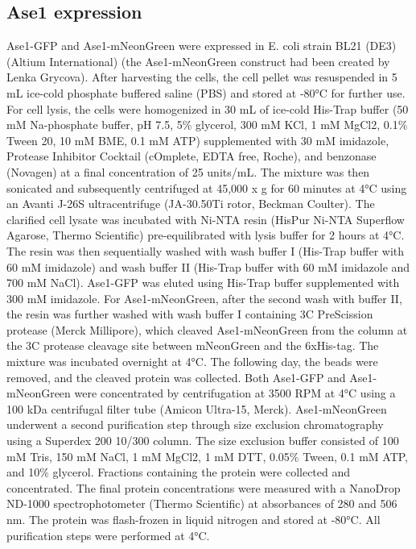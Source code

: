 \subsection{Ase1 expression}
Ase1-GFP \parencite{Janson2007} and Ase1-mNeonGreen were expressed in E. coli strain BL21 (DE3) (Altium International) \alert{(the Ase1-mNeonGreen construct had been created by Lenka Grycova)}. After harvesting the cells, the cell pellet was resuspended in 5 mL ice-cold phosphate buffered saline (PBS) and stored at -80°C for further use. For cell lysis, the cells were homogenized in 30 mL of ice-cold His-Trap buffer (50 mM Na-phosphate buffer, pH 7.5, 5\% glycerol, 300 mM KCl, 1 mM MgCl2, 0.1\% Tween 20, 10 mM BME, 0.1 mM ATP) supplemented with 30 mM imidazole, Protease Inhibitor Cocktail (cOmplete, EDTA free, Roche), and benzonase (Novagen) at a final concentration of 25 units/mL. The mixture was then sonicated and subsequently centrifuged at 45,000 x g for 60 minutes at 4°C using an Avanti J-26S ultracentrifuge (JA-30.50Ti rotor, Beckman Coulter). The clarified cell lysate was incubated with Ni-NTA resin (HisPur Ni-NTA Superflow Agarose, Thermo Scientific) pre-equilibrated with lysis buffer for 2 hours at 4°C. The resin was then sequentially washed with wash buffer I (His-Trap buffer with 60 mM imidazole) and wash buffer II (His-Trap buffer with 60 mM imidazole and 700 mM NaCl). Ase1-GFP was eluted using His-Trap buffer supplemented with 300 mM imidazole. For Ase1-mNeonGreen, after the second wash with buffer II, the resin was further washed with wash buffer I containing 3C PreScission protease (Merck Millipore), which cleaved Ase1-mNeonGreen from the column at the 3C protease cleavage site between mNeonGreen and the 6xHis-tag. The mixture was incubated overnight at 4°C. The following day, the beads were removed, and the cleaved protein was collected. Both Ase1-GFP and Ase1-mNeonGreen were concentrated by centrifugation at 3500 RPM at 4°C using a 100 kDa centrifugal filter tube (Amicon Ultra-15, Merck). Ase1-mNeonGreen underwent a second purification step through size exclusion chromatography using a Superdex 200 10/300 column. The size exclusion buffer consisted of 100 mM Tris, 150 mM NaCl, 1 mM MgCl2, 1 mM DTT, 0.05\% Tween, 0.1 mM ATP, and 10\% glycerol. Fractions containing the protein were collected and concentrated. The final protein concentrations were measured with a NanoDrop ND-1000 spectrophotometer (Thermo Scientific) at absorbances of 280 and 506 nm. The protein was flash-frozen in liquid nitrogen and stored at -80°C. All purification steps were performed at 4°C.

